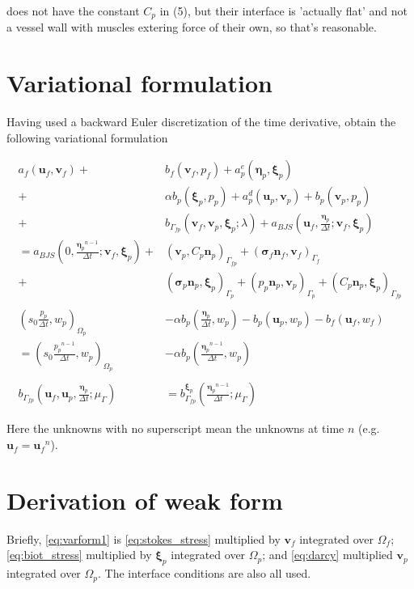 \documentclass{article}
\newcommand{\mathspace}[1]{\ensuremath{#1}\xspace} %
\newcommand{\sigmabf}{\mathspace{\boldsymbol{\sigma}}}
\newcommand{\inner}[2]{\mathspace{\left (#1, #2 \right)}}
\newcommand{\dt}{\mathspace{\Delta t}}
\newcommand{\stokes}{\mathspace{\Omega_{f}}}
\newcommand{\stokesbdy}{\mathspace{\Gamma_{f}}}
\newcommand{\darcy}{\mathspace{\Omega_{p}}}
\newcommand{\darcybdy}{\mathspace{\Gamma_{p}}}
\newcommand{\interface}{\mathspace{\Gamma_{fp}}}
\newcommand{\nf}{\mathspace{\mathbf{n}_f}}
\newcommand{\np}{\mathspace{\mathbf{n}_p}}
\newcommand{\uf}{\mathspace{\mathbf{u}_f}}
\newcommand{\vf}{\mathspace{\mathbf{v}_f}}
\newcommand{\up}{\mathspace{\mathbf{u}_p}}
\newcommand{\vp}{\mathspace{\mathbf{v}_p}}
\newcommand{\pf}{\mathspace{p_f}}
\newcommand{\pp}{\mathspace{p_p}}
\newcommand{\wf}{\mathspace{w_f}}
\renewcommand{\wp}{\mathspace{w_p}}
\newcommand{\disp}{\mathspace{\boldsymbol{\eta}_p}}
\newcommand{\disptest}{\mathspace{\boldsymbol{\xi}_p}}
\newcommand{\multtest}{\mathspace{\mu_{\Gamma}}}
\begin{document}
\cite{ambartsumyan} does not have the constant $C_p$ in (5), but their interface is 'actually flat' and not a vessel wall with muscles extering force of their own, so that's reasonable.


\section{Variational formulation}
Having used a backward Euler discretization of the time derivative, \cite{ambartsumyan} obtain the following variational formulation

\begin{subequations}
  \begin{align}
    a_f(\uf, \vf) +& b_f(\vf, \pf)  + a^e_p(\disp, \disptest) \label{eq:varform1} \\
    +&\alpha b_p(\disptest, \pp)  + a_p^d(\up, \vp) + b_p(\vp, \pp)  \nonumber \\
    + &b_{\interface}\left (\vf, \vp, \disptest; \lambda \right ) + a_{BJS}\left (\uf, \frac{\disp} {\dt}; \vf, \disptest \right)\nonumber \\
                   = a_{BJS}\left (0, \frac{\disp^{n-1}} {\dt}; \vf, \disptest \right) + & \inner{\vp}{C_p\np}_{\interface} + (\sigmabf_f\nf, \vf)_{\stokesbdy} \nonumber \\
                   + & (\sigmabf_p\np, \disptest)_{\darcybdy} + (\pp\np, \vp)_{\darcybdy} + \inner{C_p\np}{\disptest}_{\interface}\nonumber \\ \nonumber \\
    \inner{s_0 \frac {\pp} {\dt}}{\wp}_{\darcy}  &- \alpha b_p\left ( \frac{\disp} {\dt}, \wp \right ) - b_p(\up, \wp) - b_f(\uf, \wf) \label{eq:varform2}
    \\ = \inner{s_0 \frac {\pp^{n-1}} {\dt}}{\wp}_{\darcy} &- \alpha b_p\left ( \frac {\disp^{n-1}} {\dt}, \wp \right ) \nonumber \\ \nonumber \\
    b_{\interface}\left (\uf, \up, \frac {\disp} {\dt}; \multtest \right ) &= b^{\disptest}_{\interface}\left (\frac {\disp^{n-1}} {\dt}; \multtest \right ) \label{eq:varform3}
  \end{align}
\end{subequations}

Here the unknowns with no superscript mean the unknowns at time $n$ (e.g. $\uf = \uf^n$). 



\section{Derivation of weak form}
Briefly, \eqref{eq:varform1} is \eqref{eq:stokes_stress} multiplied by \vf integrated over \stokes; \eqref{eq:biot_stress} multiplied by \disptest integrated over \darcy; and \eqref{eq:darcy} multiplied \vp integrated over \darcy. The interface conditions are also all used.
\end{document}

